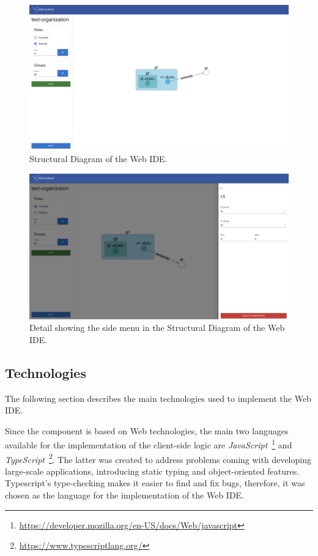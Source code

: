 \begin{figure}
    \centering
    \includegraphics[width=\linewidth]{images/ide/structural.png}
    \caption{Structural Diagram of the Web IDE.}
    \label{fig:ide-structural-all}
\end{figure}

\begin{figure}
    \centering
    \includegraphics[width=\linewidth]{images/ide/structural-side.png}
    \caption{Detail showing the side menu in the Structural Diagram of the Web IDE.}
    \label{fig:ide-structural-side}
\end{figure}

\subsection{Technologies}
The following section describes the main technologies used to implement the Web IDE.

Since the component is based on Web technologies, the main two languages available for the implementation of the client-side logic are \textit{JavaScript}~\footnote{\url{https://developer.mozilla.org/en-US/docs/Web/javascript}} and \textit{TypeScript}~\footnote{\url{https://www.typescriptlang.org/}}.
The latter was created to address problems coming with developing large-scale applications, introducing static typing and object-oriented features.
Typescript's type-checking makes it easier to find and fix bugs, therefore, it was chosen as the language for the implementation of the Web IDE.

